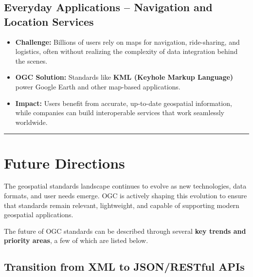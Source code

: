 \documentclass[
  11pt,
  letterpaper,
]{book}
\providecommand{\tightlist}{%
  \setlength{\itemsep}{0pt}\setlength{\parskip}{0pt}}
\begin{document}
\subsection{Everyday Applications -- Navigation and Location
Services}\label{everyday-applications-navigation-and-location-services}

\begin{itemize}
\tightlist
\item
  \textbf{Challenge:} Billions of users rely on maps for navigation,
  ride-sharing, and logistics, often without realizing the complexity of
  data integration behind the scenes.\\
\item
  \textbf{OGC Solution:} Standards like \textbf{KML (Keyhole Markup
  Language)} power Google Earth and other map-based applications.\\
\item
  \textbf{Impact:} Users benefit from accurate, up-to-date geospatial
  information, while companies can build interoperable services that
  work seamlessly worldwide.
\end{itemize}

\begin{center}\rule{0.5\linewidth}{0.5pt}\end{center}

\section{Future Directions}\label{future-directions}

The geospatial standards landscape continues to evolve as new
technologies, data formats, and user needs emerge. OGC is actively
shaping this evolution to ensure that standards remain relevant,
lightweight, and capable of supporting modern geospatial applications.

The future of OGC standards can be described through several \textbf{key
trends and priority areas}, a few of which are listed below.

\subsection{Transition from XML to JSON/RESTful
APIs}\label{transition-from-xml-to-jsonrestful-apis}
\end{document}
